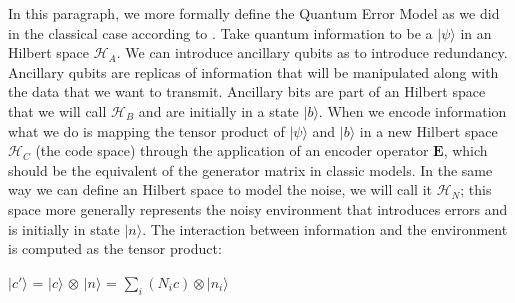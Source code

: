 \documentclass{Configuration_Files/PoliMi3i_thesis}
\begin{document}

In this paragraph, we more formally define the Quantum Error Model as we did in the classical case according to \cite{Cha06}. Take quantum information to be a $|\psi \rangle$ in an Hilbert space $\mathscr{H}_A$. We can introduce ancillary qubits as to introduce redundancy. Ancillary qubits are replicas of information that will be manipulated along with the data that we want to transmit.
Ancillary bits are part of an Hilbert space that we will call $\mathscr{H}_B$ and are initially in a state $|b \rangle$. When we encode information what we do is mapping the tensor product of $|\psi \rangle$ and $|b \rangle$ in a new Hilbert space $\mathscr{H}_C$ (the code space) through the application of an encoder operator $\textbf{E}$, which should be the equivalent of the generator matrix in classic models. In the same way we can define an Hilbert space to model the noise, we will call it $\mathscr{H}_N$; this space more generally represents the noisy environment that introduces errors and is initially in state $|n \rangle$. The interaction between information and the environment is computed as the tensor product:

\begin{center}
	$|c' \rangle$ = $|c \rangle$ $\otimes$ $|n \rangle$ = $\sum_{i} (N_i c) \otimes |n_i \rangle $
\end{center}
\end{document}
